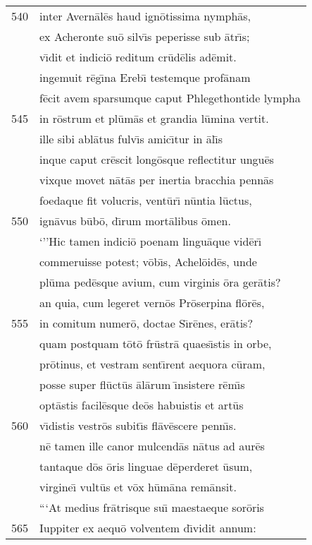 \documentclass[paper=6in:9in,pagesize=pdftex,
               headinclude=on,footinclude=on,12pt]{scrbook}
\begin{document}
\begin{longtable}[p]{ r l }
540 & inter Avern\=al\=es haud ign\=otissima nymph\=as,\\ 
 & ex Acheronte su\=o silv\={\i}s peperisse sub \=atr\={\i}s;\\ 
 & v\={\i}dit et indici\=o reditum cr\=ud\=elis ad\=emit.\\ 
 & ingemuit r\=eg\={\i}na Ereb\={\i} testemque prof\=anam\\ 
 & f\=ecit avem sparsumque caput Phlegethontide lympha\\ 
545 & in r\=ostrum et pl\=um\=as et grandia l\=umina vertit.\\ 
 & ille sibi abl\=atus fulv\={\i}s amic\={\i}tur in \=al\={\i}s\\ 
 & inque caput cr\=escit long\=osque reflectitur ungu\=es\\ 
 & vixque movet n\=at\=as per inertia bracchia penn\=as\\ 
 & foedaque fit volucris, vent\=ur\={\i} n\=untia l\=uctus,\\ 
550 & ign\=avus b\=ub\=o, d\={\i}rum mort\=alibus \=omen.\\ 
 & \indent `''Hic tamen indici\=o poenam lingu\=aque vid\=er\={\i}\\ 
 & commeruisse potest; v\=ob\={\i}s, Achel\=oid\=es, unde\\ 
 & pl\=uma ped\=esque avium, cum virginis \=ora ger\=atis?\\ 
 & an quia, cum legeret vern\=os Pr\=oserpina fl\=or\=es,\\ 
555 & in comitum numer\=o, doctae S\={\i}r\=enes, er\=atis?\\ 
 & quam postquam t\=ot\=o fr\=ustr\=a quaes\={\i}stis in orbe,\\ 
 & pr\=otinus, et vestram sent\={\i}rent aequora c\=uram,\\ 
 & posse super fl\=uct\=us \=al\=arum \={\i}nsistere r\=em\={\i}s\\ 
 & opt\=astis facil\=esque de\=os habuistis et art\=us\\ 
560 & v\={\i}distis vestr\=os subit\={\i}s fl\=av\=escere penn\={\i}s.\\ 
 & n\=e tamen ille canor mulcend\=as n\=atus ad aur\=es\\ 
 & tantaque d\=os \=oris linguae d\=eperderet \=usum,\\ 
 & virgine\={\i} vult\=us et v\=ox h\=um\=ana rem\=ansit.\\ 
 & \indent ```At medius fr\=atrisque su\={\i} maestaeque sor\=oris\\ 
565 & Iuppiter ex aequ\=o volventem d\={\i}vidit annum:\\ 

\end{longtable}
\end{document}
